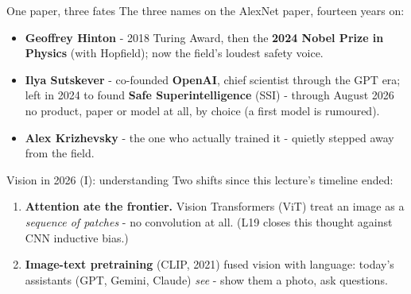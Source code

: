 \documentclass[aspectratio=169]{beamer}
\begin{document}
\begin{frame}{One paper, three fates}
  The three names on the AlexNet paper, fourteen years on:
  \vskip 8pt
  \begin{itemize}
    \item \textbf{Geoffrey Hinton} - 2018 Turing Award, then the \textbf{2024 Nobel
      Prize in Physics} (with Hopfield); now the field's loudest safety voice.
    \item \textbf{Ilya Sutskever} - co-founded \textbf{OpenAI}, chief scientist
      through the GPT era; left in 2024 to found \textbf{Safe Superintelligence}
      (SSI) - through August 2026 no product, paper or model at all, by choice (a first
      model is rumoured).
    \item \textbf{Alex Krizhevsky} - the one who actually trained it - quietly
      stepped away from the field.
  \end{itemize}
  \vskip 10pt
\end{frame}

\begin{frame}{Vision in 2026 (I): understanding}
  Two shifts since this lecture's timeline ended:
  \vskip 6pt
  \begin{enumerate}
    \item \textbf{Attention ate the frontier.} Vision Transformers (ViT) treat an
      image as a \emph{sequence of patches} - no convolution at all. (L19 closes
      this thought against CNN inductive bias.)
    \item \textbf{Image-text pretraining} (CLIP, 2021) fused vision with language:
      today's assistants (GPT, Gemini, Claude) \emph{see} - show them a photo, ask
      questions.
  \end{enumerate}
  \vskip 8pt
  \vskip 4pt
  \begin{center}
    \href{https://claude.ai}{}
  \end{center}
\end{frame}
\end{document}
